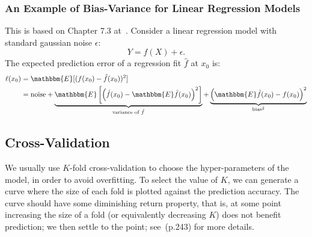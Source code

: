         \subsubsection{An Example of Bias-Variance for Linear Regression Models }
        This is based on Chapter 7.3 at~\cite{hastie2009elements}.
        Consider a linear regression model with standard gaussian noise $\epsilon$:
            \begin{equation}
                Y = f(X) + \epsilon.
            \end{equation}
        The expected prediction error of a regression fit $\hat{f}$ at $x_0$ is:
            \begin{equation}
                \begin{aligned}
                    \ell(x_0) & = \mathbbm{E}[(f(x_0) - \hat{f}(x_0))^2] \\
                    & = \text{noise} + \underbrace{\mathbbm{E}\left[\left(\hat{f}(x_0) - \mathbbm{E}\hat{f}(x_0) \right)^2 \right]}_{\text{variance of $\hat{f}$}} + \underbrace{\left( \mathbbm{E}\hat{f}(x_0) - f(x_0) \right)^2}_{\text{bias}^2}
                \end{aligned}
            \end{equation}
        
        


\subsection{Cross-Validation}
    We usually use $K$-fold cross-validation to choose the hyper-parameters of the model, in order to avoid overfitting.
    To select the value of $K$, we can generate a curve where the size of each fold is plotted against the prediction accuracy. 
    The curve should have some diminishing return property, that is, at some point increasing the size of a fold (or equivalently decreasing $K$) does not benefit prediction; we then settle to the point; see~\cite{hastie2009elements}(p.243) for more details.



